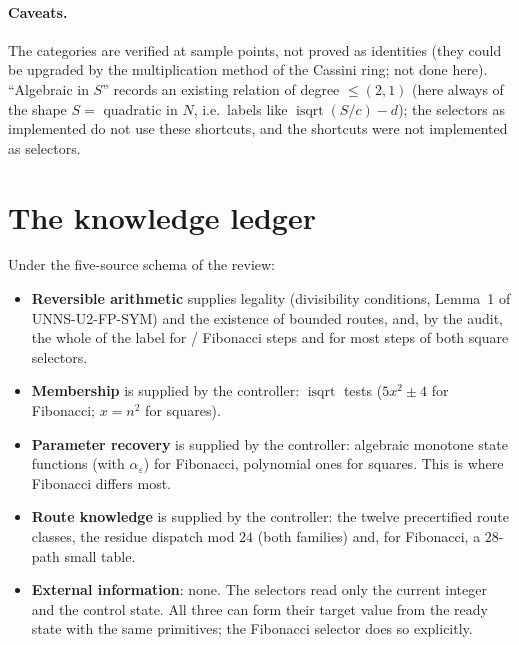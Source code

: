 \documentclass[11pt]{article}
\theoremstyle{definition}
\theoremstyle{remark}
\DeclareMathOperator{\isqrt}{isqrt}
\begin{document}
\paragraph{Caveats.} The categories are verified at sample points, not proved as identities (they could be upgraded by the multiplication method of the Cassini ring; not done here). ``Algebraic in $S$'' records an existing relation of degree $\le(2,1)$ (here always of the shape $S=$ quadratic in $N$, i.e.\ labels like $\isqrt(S/c)-d$); the selectors as implemented do not use these shortcuts, and the shortcuts were not implemented as selectors.

\section{The knowledge ledger}\label{sec:ledger}
\begin{table}[ht]\centering\footnotesize

\caption{Ledger for the three selectors. Control states are counted as $1+\sum(\text{steps}-1)$ over route classes and small-table paths (the convention of UNNS-U2-SQ). The Fibonacci figure of \FibQ{} comprises $87$ for the twelve route classes (the earlier ``99'' counted route \emph{labels}) and $113$ for the small-index table.}
\end{table}
Under the five-source schema of the review:
\begin{itemize}\setlength\itemsep{1pt}
\item \textbf{Reversible arithmetic} supplies legality (divisibility conditions, Lemma~1 of UNNS-U2-FP-SYM) and the existence of bounded routes, and, by the audit, the whole of the label for \FibNoRec/\NFib{} Fibonacci steps and for most steps of both square selectors.
\item \textbf{Membership} is supplied by the controller: $\isqrt$ tests ($5x^2\pm4$ for Fibonacci; $x=n^2$ for squares).
\item \textbf{Parameter recovery} is supplied by the controller: algebraic monotone state functions (with $\alpha_\varepsilon$) for Fibonacci, polynomial ones for squares. This is where Fibonacci differs most.
\item \textbf{Route knowledge} is supplied by the controller: the twelve precertified route classes, the residue dispatch mod $24$ (both families) and, for Fibonacci, a $28$-path small table.
\item \textbf{External information}: none. The selectors read only the current integer and the control state. All three can form their target value from the ready state with the same primitives; the Fibonacci selector does so explicitly.
\end{itemize}
\end{document}

